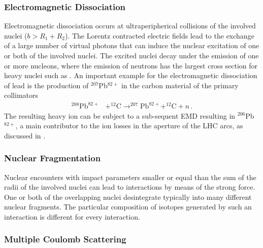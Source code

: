 \subsubsection{Electromagnetic Dissociation}
Electromagnetic dissociation occurs at ultraperipherical collisions of the involved nuclei ($b>R_1 + R_2$). The Lorentz contracted electric fields lead to the exchange of a large number of virtual photons that can induce the nuclear excitation of one or both of the involved nuclei. The excited nuclei decay under the emission of one or more nucleons, where the emission of neutrons has the largest cross section for heavy nuclei such as \lead. An important example for the electromagnetic dissociation of lead is the production of $^{207}$Pb$^{82+}$ in the carbon material of the primary collimators 
\begin{align}
^{208}\text{Pb}^{82+} &+ ^{12}\text{C} \rightarrow ^{207}\text{Pb}^{82+}  + ^{12}\text{C} + n \, .
\end{align}
The resulting heavy ion can be subject to a sub-sequent EMD resulting in $^{206}$Pb$^{82+}$, a main contributor to the ion losses in the aperture of the LHC arcs, as discussed in .

\subsubsection{Nuclear Fragmentation}
Nuclear encounters with impact parameters smaller or equal than the sum of the radii of the involved nuclei can lead to interactions by means of the strong force. One or both of the overlapping nuclei desintegrate typically into many different nuclear fragments. The particular composition of isotopes generated by such an interaction is different for every interaction. 

\subsubsection{Multiple Coulomb Scattering}

